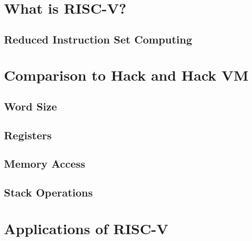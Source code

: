 \maketitle

\section{What is RISC-V?}

\subsection{Reduced Instruction Set Computing}

\section{Comparison to Hack and Hack VM}

\subsection{Word Size}

\subsection{Registers}

\subsection{Memory Access}

\subsection{Stack Operations}

\section{Applications of RISC-V}
